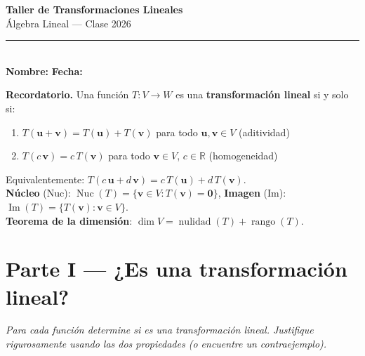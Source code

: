\documentclass[12pt, letterpaper]{article}
\newcommand{\R}{\mathbb{R}}
\newcommand{\Ker}{\operatorname{Nuc}}   %
\newcommand{\Img}{\operatorname{Im}}    %
\newcommand{\rango}{\operatorname{rango}}
\newcommand{\nulidad}{\operatorname{nulidad}}
\begin{document}
\begin{center}
  {\LARGE\bfseries\color{azuloscuro} Taller de Transformaciones Lineales}\\[6pt]
  {\large Álgebra Lineal — Clase 2026}\\[4pt]
  \rule{\linewidth}{1pt}\\[2pt]
  \textbf{Nombre:}\underline{\hspace{8cm}}
  \quad
  \textbf{Fecha:}\underline{\hspace{3cm}}
\end{center}

\vspace{4pt}

\begin{cajarecordatorio}
\textbf{Recordatorio.}
Una función $T: V \to W$ es una \textbf{transformación lineal} si y solo si:
\begin{enumerate}[label=(\roman*), itemsep=0pt]
  \item $T(\mathbf{u}+\mathbf{v}) = T(\mathbf{u})+T(\mathbf{v})$ para todo $\mathbf{u},\mathbf{v}\in V$ \hfill (aditividad)
  \item $T(c\,\mathbf{v}) = c\,T(\mathbf{v})$ para todo $\mathbf{v}\in V$, $c\in\R$ \hfill (homogeneidad)
\end{enumerate}
Equivalentemente: $T(c\,\mathbf{u}+d\,\mathbf{v})=c\,T(\mathbf{u})+d\,T(\mathbf{v})$.\\[4pt]
\textbf{Núcleo} (Nuc): $\Ker(T)=\{\mathbf{v}\in V : T(\mathbf{v})=\mathbf{0}\}$,\quad
\textbf{Imagen} (Im): $\Img(T)=\{T(\mathbf{v}) : \mathbf{v}\in V\}$.\\[2pt]
\textbf{Teorema de la dimensión}: $\dim V = \nulidad(T) + \rango(T)$.
\end{cajarecordatorio}

\vspace{8pt}

\section*{\color{azuloscuro} Parte I — ¿Es una transformación lineal?}
\textit{Para cada función determine si es una transformación lineal. Justifique rigurosamente usando las dos propiedades (o encuentre un contraejemplo).}

\vspace{6pt}
\end{document}
